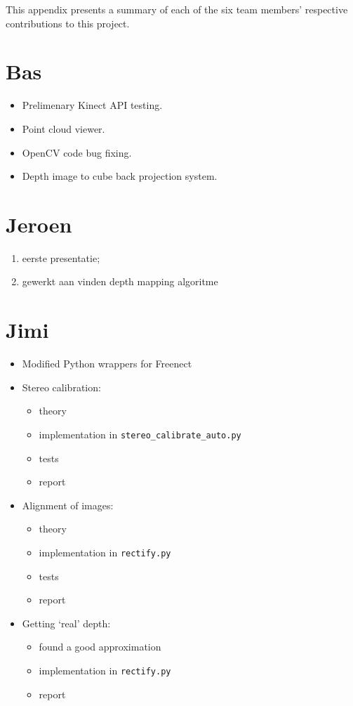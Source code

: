 This appendix presents a summary of each of the six team members' respective
contributions to this project.


\section*{Bas}
\begin{itemize}
    \item Prelimenary Kinect API testing.
    \item Point cloud viewer.
    \item OpenCV code bug fixing.
    \item Depth image to cube back projection system.
\end{itemize}

\section*{Jeroen}
\begin{enumerate}
\item eerste presentatie;
\item gewerkt aan vinden depth mapping algoritme
\end{enumerate}

\section*{Jimi}
\begin{itemize}
\item Modified Python wrappers for Freenect
\item Stereo calibration:
    \begin{itemize}
        \item theory
        \item implementation in \verb|stereo_calibrate_auto.py|
        \item tests
        \item report
    \end{itemize}
\item Alignment of images:
    \begin{itemize}
        \item theory
        \item implementation in \verb|rectify.py|
        \item tests
        \item report
    \end{itemize}
\item Getting `real' depth:
    \begin{itemize}
        \item found a good approximation
        \item implementation in \verb|rectify.py|
        \item report
    \end{itemize}
\end{itemize}

